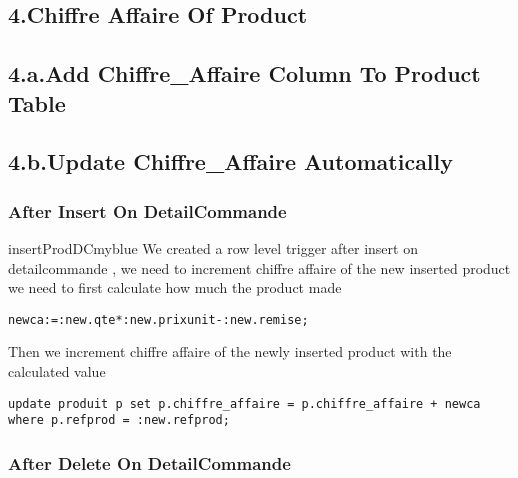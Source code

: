 \subsection*{4.Chiffre Affaire Of Product}
\subsection*{4.a.Add Chiffre\_Affaire Column To Product Table}


\subsection*{4.b.Update Chiffre\_Affaire Automatically}
\newpage
\subsubsection*{After Insert On DetailCommande}


\begin{prettyBox}{insertProdDC}{myblue}
We created a row level trigger after insert on detailcommande , we need to increment chiffre affaire of the new inserted product 
we need to first calculate how much the product made 

\begin{lstlisting}
newca:=:new.qte*:new.prixunit-:new.remise;
\end{lstlisting}

Then we increment chiffre affaire of the newly inserted product with the calculated value

\begin{lstlisting}
update produit p set p.chiffre_affaire = p.chiffre_affaire + newca 
where p.refprod = :new.refprod;
\end{lstlisting}

\end{prettyBox}

\vspace{0.25cm}

\subsubsection*{After Delete On DetailCommande}



